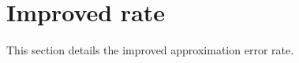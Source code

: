 











\section{Improved rate}

This section details the improved approximation error rate.




